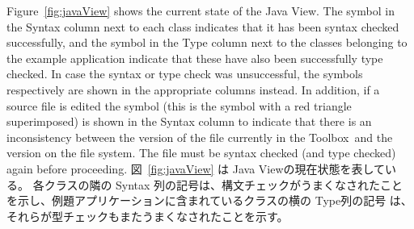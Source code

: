 \documentclass[\pformat,12pt]{jarticle}
\newcommand{\Toolbox}{Toolbox}
\newcommand{\guicmd}[1]{{\sf #1}}
\begin{document}
Figure~\ref{fig:javaView} shows the current state of the \guicmd{Java
  View}. The symbol
in the \guicmd{Syntax} column next to each class indicates that it has
  been syntax checked successfully, and the symbol
  in the \guicmd{Type} column next to the classes belonging to the
  example application indicate that these have also been successfully
  type checked. In case the syntax or type check was unsuccessful, the
  symbols 
  respectively
are shown in the appropriate columns instead. In addition, if a source
  file is edited the symbol
  (this is the symbol 
with a red triangle superimposed)
is shown in the \guicmd{Syntax} column to indicate that there is an
  inconsistency between the version of the file 
currently in the \Toolbox\ and the version on the file system. The
file must be syntax checked (and type checked) again before proceeding.
図~\ref{fig:javaView} は \guicmd{Java View}の現在状態を表している。 
各クラスの隣の \guicmd{Syntax} 列の記号は、構文チェックがうまくなされたことを示し、例題アプリケーションに含まれているクラスの横の \guicmd{Type}列の記号 は、それらが型チェックもまたうまくなされたことを示す。
\end{document}
